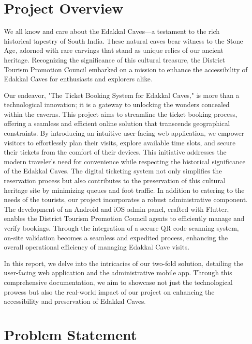 \documentclass[12pt,a4paper]{report}
\begin{document}
\section{Project Overview}

We all know and care about the Edakkal Caves—a testament to the rich historical tapestry of South India. These natural caves bear witness to the Stone Age, adorned with rare carvings that stand as unique relics of our ancient heritage. Recognizing the significance of this cultural treasure, the District Tourism Promotion Council embarked on a mission to enhance the accessibility of Edakkal Caves for enthusiasts and explorers alike.

Our endeavor, "The Ticket Booking System for Edakkal Caves," is more than a technological innovation; it is a gateway to unlocking the wonders concealed within the caverns. This project aims to streamline the ticket booking process, offering a seamless and efficient online solution that transcends geographical constraints. By introducing an intuitive user-facing web application, we empower visitors to effortlessly plan their visits, explore available time slots, and secure their tickets from the comfort of their devices.
This initiative addresses the modern traveler's need for convenience while respecting the historical significance of the Edakkal Caves. The digital ticketing system not only simplifies the reservation process but also contributes to the preservation of this cultural heritage site by minimizing queues and foot traffic.
In addition to catering to the needs of the tourists, our project incorporates a robust administrative component. The development of an Android and iOS admin panel, crafted with Flutter, enables the District Tourism Promotion Council agents to efficiently manage and verify bookings. Through the integration of a secure QR code scanning system, on-site validation becomes a seamless and expedited process, enhancing the overall operational efficiency of managing Edakkal Cave visits.

In this report, we delve into the intricacies of our two-fold solution, detailing the user-facing web application and the administrative mobile app. Through this comprehensive documentation, we aim to showcase not just the technological prowess but also the real-world impact of our project on enhancing the accessibility and preservation of Edakkal Caves.

\section{Problem Statement}
\end{document}

